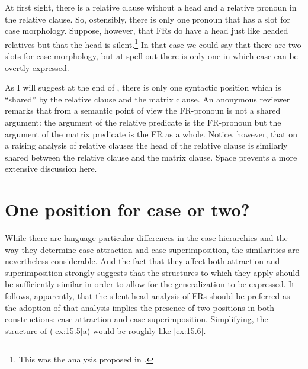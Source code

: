 \documentclass[output=paper]{langsci/langscibook}
\begin{document}
\begin{refcontext}
\ea\label{ex:15.5}
    \z
\z
At first sight, there is a relative clause without a head and a relative
pronoun in the relative clause. So, ostensibly, there is only one pronoun that
has a slot for case morphology. Suppose, however, that \glspl{FR} do have a
head just like headed relatives but that the head is silent.\footnote{This was
the analysis proposed in \citet{GroosVanRiemsdijk1981}.} In that case we could
say that there are two slots for case morphology, but at spell-out there is
only one in which case can be overtly expressed.

As I will suggest at the end of , there is only one
syntactic position which is \enquote{shared} by the relative clause and the
matrix clause. An anonymous reviewer remarks that from a semantic point of view
the FR-pronoun is not a shared argument: the argument of the relative predicate
is the FR-pronoun but the argument of the matrix predicate is the FR as a
whole. Notice, however, that on a raising analysis of relative
clauses the head
of the relative clause is similarly shared between the relative clause and the
matrix clause. Space prevents a more extensive discussion here.

\section{One position for case or two?}

While there are language particular differences in the case hierarchies and the
way they determine case attraction and case superimposition, the similarities
are nevertheless considerable. And the fact that they affect both attraction
and superimposition strongly suggests that the structures to which they apply
should be sufficiently similar in order to allow for the generalization to be
expressed. It follows, apparently, that the silent head analysis of \glspl{FR}
should be preferred as the adoption of that analysis implies the presence of
two positions in both constructions: case attraction and case superimposition.
Simplifying, the structure of  (\ref{ex:15.5}a) would be roughly like \eqref{ex:15.6}.


\end{refcontext}
\end{document}
